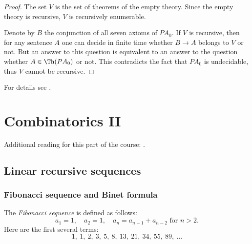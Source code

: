 \begin{page}
\setcounter{section}{0}
\setcounter{subsection}{0}
\setcounter{dfn}{37}
\label{portion:776}

\begin{proof}
The set $V$ is the set of theorems of the empty theory. Since the empty theory is recursive, $V$ is recursively enumerable.

Denote by $B$ the conjunction of all seven axioms of $PA_0$.
If $V$ is recursive, then for any sentence $A$ one can decide in finite time whether $B \to A$ belongs to $V$ or not.
But an answer to this question is equivalent to an answer to the question whether $A \in \Th(PA_0)$ or not.
This contradicts the fact that $PA_0$ is undecidable, thus $V$ cannot be recursive.
\end{proof}




For details see \cite{CL1,CL2}.





\end{page}

\begin{page}
\setcounter{section}{1}
\setcounter{subsection}{0}
\setcounter{dfn}{37}
\label{portion:778}

\chapter{Combinatorics II}
Additional reading for this part of the course: \cite{Aig07}.


\end{page}

\begin{page}
\setcounter{section}{1}
\setcounter{subsection}{1}
\setcounter{dfn}{0}
\label{portion:780}

\section{Linear recursive sequences}

\end{page}

\begin{page}
\setcounter{section}{1}
\setcounter{subsection}{1}
\setcounter{dfn}{0}
\label{portion:782}

\subsection{Fibonacci sequence and Binet formula}
The \emph{Fibonacci sequence} is defined as follows:
\[
a_1 = 1, \quad a_2 = 1, \quad a_n = a_{n-1} + a_{n-2} \text{ for }n > 2.
\]
Here are the first several terms:
\[
1,\ 1,\ 2,\ 3,\ 5,\ 8,\ 13,\ 21,\ 34,\ 55,\ 89,\ \ldots
\]


\end{page}


